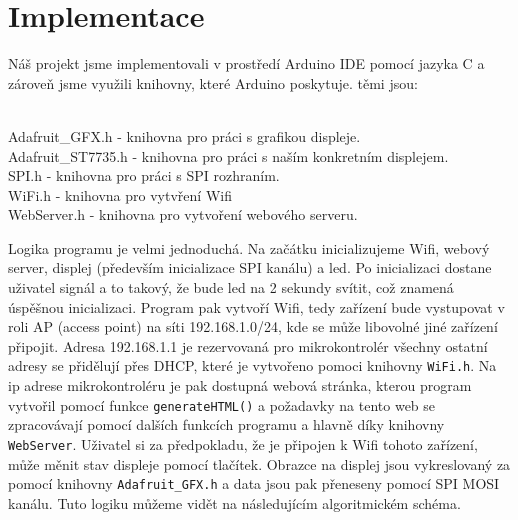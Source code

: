 \section{Implementace}
Náš projekt jsme implementovali v prostředí Arduino IDE pomocí jazyka C a zároveň jsme využili knihovny, které Arduino poskytuje. těmi jsou: \\\\
\begin{listlisting}
\<Adafruit\_GFX.h\> - knihovna pro práci s grafikou displeje. \\
\<Adafruit\_ST7735.h\> - knihovna pro práci s naším konkretním displejem. \\ 
\<SPI.h\> - knihovna pro práci s SPI rozhraním. \\
\<WiFi.h\> - knihovna pro vytvření Wifi \\
\<WebServer.h\> - knihovna pro vytvoření webového serveru. \\
\end{listlisting}

Logika programu je velmi jednoduchá. Na začátku inicializujeme Wifi, webový server, displej (především inicializace SPI kanálu) a led. Po inicializaci dostane uživatel signál a to takový, že bude led na 2 sekundy svítit, což znamená úspěšnou inicializaci. Program pak vytvoří Wifi, tedy zařízení bude vystupovat v roli AP (access point) na síti 192.168.1.0/24, kde se může libovolné jiné zařízení připojit. Adresa 192.168.1.1 je rezervovaná pro mikrokontrolér všechny ostatní adresy se přidělují přes DHCP, které je vytvořeno pomoci knihovny \texttt{WiFi.h}. Na ip adrese mikrokontroléru je pak dostupná webová stránka, kterou program vytvořil pomocí funkce \texttt{generateHTML()} a požadavky na tento web se zpracovávají pomocí dalších funkcích programu a hlavně díky knihovny \texttt{WebServer}. Uživatel si za předpokladu, že je připojen k Wifi tohoto zařízení, může měnit stav displeje pomocí tlačítek. Obrazce na displej jsou vykreslovaný za pomocí knihovny \texttt{Adafruit\_GFX.h} a data jsou pak přeneseny pomocí SPI MOSI kanálu. Tuto logiku můžeme vidět na následujícím algoritmickém schéma.

